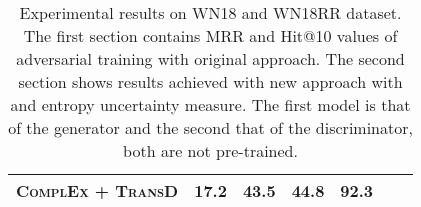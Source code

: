 \begin{table}[h]
\begin{tabular}{lllllll}
         \textsc{ComplEx} + \textsc{TransD}
          & 17.2 
          & 43.5
          & 44.8 
          & 92.3 
          \\
        \bottomrule
    \end{tabular}
    \caption{Experimental results on \textsc{WN18} and \textsc{WN18RR} dataset.
    The first section contains MRR and Hit@10 values of adversarial training with original \kbgan approach.
    The second section shows results achieved with new approach \usgan with \ussoftmax and entropy uncertainty measure.
    The first model is that of the generator and the second that of the discriminator, both are not pre-trained.}
\label{tab:result_table2}
\end{table}